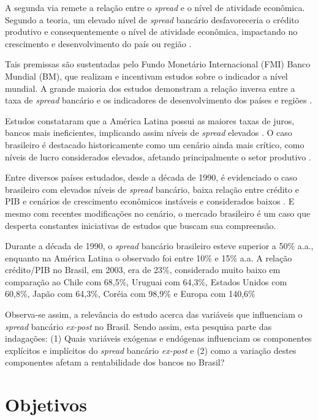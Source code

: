 \documentclass[12pt,12pt,openright,oneside,a4paper,chapter=TITLE,section=TITLE,subsection=TITLE,subsubsection=TITLE,english,french,spanish,portugues,sumario=tradicional]{abntex2}
\begin{document}
A segunda via remete a relação entre o \emph{spread} e o nível de atividade
econômica. Segundo a teoria, um elevado nível de \emph{spread} bancário
desfavoreceria o crédito produtivo e consequentemente o nível de atividade
econômica, impactando no crescimento e desenvolvimento do país ou região \cite{WB:2005} \cite{dantas:2012} \cite{leal:2006}.

Tais premissas são sustentadas pelo Fundo Monetário Internacional (FMI) Banco Mundial (BM), que realizam e incentivam estudos sobre o indicador a nível mundial. A grande maioria dos estudos demonstram a relação inversa entre a taxa de \emph{spread} bancário e os indicadores de desenvolvimento dos países e regiões \cite{WB:2005}.

Estudos constataram que a América Latina possui as maiores taxas de juros, bancos mais ineficientes, implicando assim níveis de \emph{spread} elevados \cite{dantas:2012}. O caso brasileiro é destacado historicamente como um cenário ainda mais crítico, como níveis de lucro considerados elevados, afetando principalmente o setor produtivo \cite{dantas:2012}.

Entre diversos países estudados, desde a década de 1990, é evidenciado o caso brasileiro com elevados níveis de \emph{spread} bancário, baixa relação entre crédito e PIB e cenários de crescimento econômicos instáveis e considerados baixos \cite{levine:1997, matos:2003}. E mesmo com recentes modificações no cenário, o mercado brasileiro é um caso que desperta constantes iniciativas de estudos que buscam sua compreensão.

Durante a década de 1990, o \emph{spread} bancário brasileiro esteve superior a 50\% a.a., enquanto na América Latina o observado foi entre 10\% e 15\% a.a. A relação crédito/PIB no Brasil, em 2003, era de 23\%, considerado muito baixo em comparação ao Chile com 68,5\%, Uruguai com 64,3\%, Estados Unidos com 60,8\%, Japão com 64,3\%, Coréia com 98,9\% e Europa com 140,6\% \cite{camargo:2009,leal:2006}

Observa-se assim, a relevância do estudo acerca das variáveis que influenciam o \emph{spread} bancário \emph{ex-post} no Brasil. Sendo assim, esta pesquisa parte das indagações: (1) Quais variáveis exógenas e endógenas influenciam os componentes explícitos e implícitos do \emph{spread} bancário \emph{ex-post} e (2) como a variação destes componentes afetam a rentabilidade dos bancos no Brasil?

\section{Objetivos}
\end{document}
